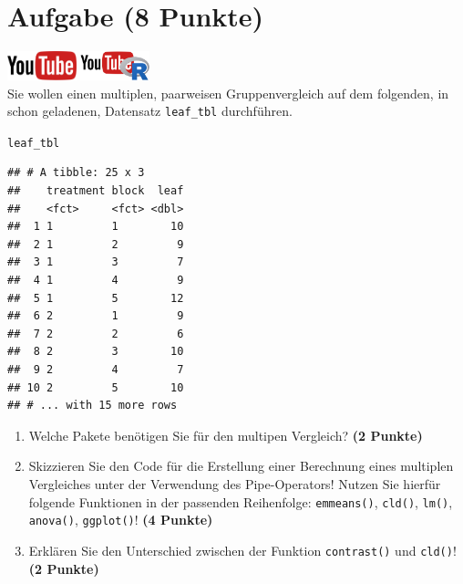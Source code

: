 \documentclass[a4paper, 10pt]{scrartcl}\usepackage[]{graphicx}\usepackage[]{xcolor}
\makeatletter
\newcommand{\hlstd}[1]{\textcolor[rgb]{0.345,0.345,0.345}{#1}}%
\newenvironment{kframe}{%
 \def\at@end@of@kframe{}%
 \ifinner\ifhmode%
  \def\at@end@of@kframe{\end{minipage}}%
  \begin{minipage}{\columnwidth}%
 \fi\fi%
 \def\FrameCommand##1{\hskip\@totalleftmargin \hskip-\fboxsep
 \colorbox{shadecolor}{##1}\hskip-\fboxsep
     \hskip-\linewidth \hskip-\@totalleftmargin \hskip\columnwidth}%
 \MakeFramed {\advance\hsize-\width
   \@totalleftmargin\z@ \linewidth\hsize
   \@setminipage}}%
 {\par\unskip\endMakeFramed%
 \at@end@of@kframe}
\newenvironment{knitrout}{}{} %
\makeatother
\begin{document}
 
\clearpage

\section{Aufgabe \hfill (8 Punkte)}

\hfill\href{https://youtu.be/f5fHm_jCHe4}{\includegraphics[width =
  2cm]{img/youtube}}
\hspace{2Ex}
\href{https://youtu.be/_EGebjrOCUQ}{\includegraphics[width =
  2cm]{img/youtube_R}}\\[1Ex]


Sie wollen einen multiplen, paarweisen Gruppenvergleich auf dem folgenden, in \Rlogo schon geladenen, Datensatz \texttt{leaf\_tbl} durchf{\"u}hren.



\begin{knitrout}
\color{fgcolor}\begin{kframe}
\begin{alltt}
\hlstd{leaf_tbl}
\end{alltt}
\begin{verbatim}
## # A tibble: 25 x 3
##    treatment block  leaf
##    <fct>     <fct> <dbl>
##  1 1         1        10
##  2 1         2         9
##  3 1         3         7
##  4 1         4         9
##  5 1         5        12
##  6 2         1         9
##  7 2         2         6
##  8 2         3        10
##  9 2         4         7
## 10 2         5        10
## # ... with 15 more rows
\end{verbatim}
\end{kframe}
\end{knitrout}

\begin{enumerate}
\item Welche \Rlogo Pakete ben{\"o}tigen Sie f{\"u}r den multipen Vergleich?
  \textbf{(2 Punkte)} 
\item Skizzieren Sie den \Rlogo Code f{\"u}r die Erstellung einer
  Berechnung eines multiplen Vergleiches unter der Verwendung des
  Pipe-Operators! Nutzen Sie hierf{\"u}r folgende Funktionen in der passenden
  Reihenfolge: \texttt{emmeans()},  \texttt{cld()},
  \texttt{lm()},  \texttt{anova()},  \texttt{ggplot()}!  \textbf{(4 Punkte)}
\item Erkl{\"a}ren Sie den Unterschied zwischen der Funktion
  \texttt{contrast()} und \texttt{cld()}!
  \textbf{(2 Punkte)}
\end{enumerate}
\end{document}
